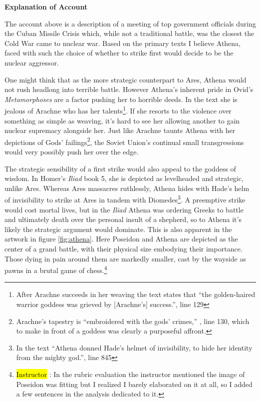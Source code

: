 \documentclass[letterpaper, reqno,11pt]{article}
\newcommand{\hlc}[2][yellow]{{%
    \colorlet{foo}{#1}%
    \sethlcolor{foo}\hl{#2}}%
}
\begin{document}
{\bf Explanation of Account}

The account above is a description of a meeting of top government officials during the Cuban Missile Crisis which, while not a traditional battle, was the closest the Cold War came to nuclear war. Based on the primary texts I believe Athena, faced with such the choice of whether to strike first would decide to be the nuclear aggressor.

One might think that as the more strategic counterpart to Ares, Athena would not rush headlong into terrible battle. However Athena's inherent pride in Ovid's {\em Metamorphoses}\autocite{ovid} are a factor pushing her to horrible deeds. In the text she is jealous of Arachne who has her talents\footnote{After Arachne succeeds in her weaving the text states that ``the golden-haired warrior goddess was grieved by [Arachne's] success.''\parencite{ovid}, line 129}. If she resorts to the violence over something as simple as weaving, it's hard to see her allowing another to gain nuclear supremacy alongside her. Just like Arachne taunts Athena with her depictions of Gods' failings\footnote{Arachne's tapestry is ``embroidered with the gods' crimes,'' \parencite{ovid}, line 130, which to make in front of a goddess was clearly a purposeful affront.}, the Soviet Union's continual small transgressions would very possibly push her over the edge.

The strategic sensibility of a first strike would also appeal to the goddess of wisdom. In Homer's {\em Iliad} book 5\autocite{homer}, she is depicted as levelheaded and strategic, unlike Ares. Whereas Ares massacres ruthlessly, Athena hides with Hade's helm of invisibility to strike at Ares in tandem with Diomedes\footnote{In the text ``Athena donned Hade's helmet of invisibility, to hide her identity from the mighty god.''\parencite{homer}, line 845}. A preemptive strike would cost mortal lives, but in the {\em Iliad} Athena was ordering Greeks to battle and ultimately death over the personal insult of a shepherd, so to Athena it's likely the strategic argument would dominate. This is also apparent in the artwork in figure \ref{fig:athena}\autocite{poseidon}. Here Poseidon and Athena are depicted as the center of a grand battle, with their physical size embodying their importance. Those dying in pain around them are markedly smaller, cast by the wayside as pawns in a brutal game of chess.\footnote{\hlc[Aquamarine]{Instructor}: In the rubric evaluation the instructor mentioned the image of Poseidon was fitting but I realized I barely elaborated on it at all, so I added a few sentences in the analysis dedicated to it.}
\end{document}
